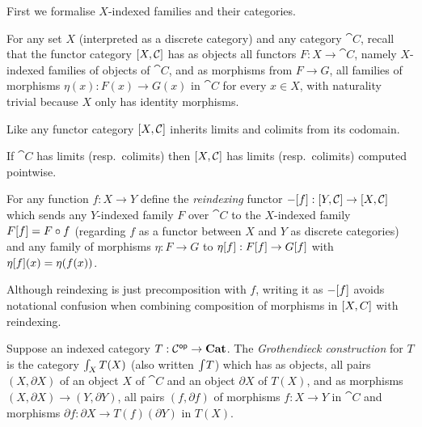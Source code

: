 First we formalise $X$-indexed families and their categories.

\begin{definition}
For any set $X$ (interpreted as a discrete category) and any category $\cat{C}$, recall that the functor
category $[X,\mathcal{C}]$ has as objects all functors $F: X \to \cat{C}$, namely $X$-indexed families of
objects of $\cat{C}$, and as morphisms from $F \to G$, all families of morphisms $\eta(x): F(x) \to G(x)$ in
$\cat{C}$ for every $x \in X$, with naturality trivial because $X$ only has identity morphisms.
\end{definition}

Like any functor category $[X,\mathcal{C}]$ inherits limits and colimits from its codomain.

\begin{proposition}
If $\cat{C}$ has limits (resp.~colimits) then $[X,\mathcal{C}]$ has limits (resp.~colimits) computed
pointwise.
\end{proposition}

\begin{definition}[Reindexing]
For any function $f: X \to Y$ define the \emph{reindexing} functor $-[f]: [Y,\mathcal{C}] \to
[X,\mathcal{C}]$ which sends any $Y$-indexed family $F$ over $\cat{C}$ to the $X$-indexed family
$F[f] = F \circ f$ (regarding $f$ as a functor between $X$ and $Y$ as discrete categories) and any
family of morphisms $\eta: F \to G$ to $\eta[f]: F[f] \to G[f]$ with
$\eta[f](x) = \eta(f(x))$.
\end{definition}

Although reindexing is just precomposition with $f$, writing it as $-[f]$ avoids notational
confusion when combining composition of morphisms in $[X,C]$ with reindexing.

\begin{definition}
\label{def:Grothendieck}
Suppose an indexed category $T: \mathcal{C}^{\mathsf{op}} \to \mathbf{Cat}$. The \emph{Grothendieck construction} for $T$ is the
category $\int_{X}T(X)$ (also written $\int_{}T$) which has as objects, all pairs $(X,
\partial X)$ of an object $X$ of $\cat{C}$ and an object $\partial X$ of $T(X)$, and as morphisms $(X,
\partial X) \to (Y, \partial Y)$, all pairs $(f, \partial f)$ of morphisms $f: X \to Y$ in $\cat{C}$ and
morphisms $\partial f: \partial X \to T(f)(\partial Y)$ in $T(X)$.
\end{definition}

